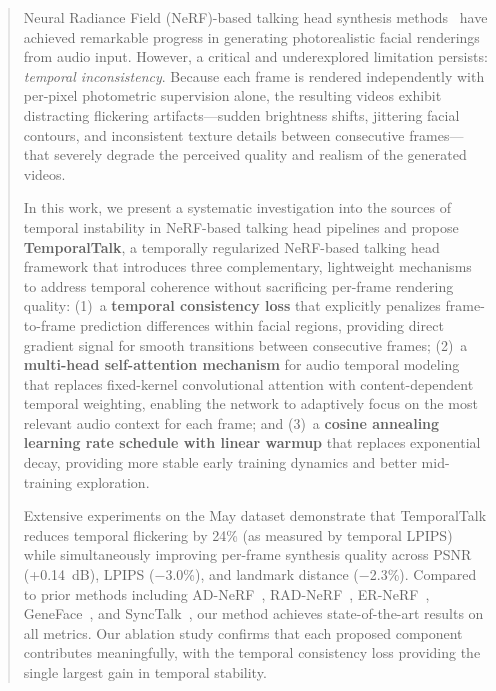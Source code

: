 \documentclass[10pt,twocolumn,letterpaper]{article}
\begin{document}
\begin{abstract}
Neural Radiance Field (NeRF)-based talking head synthesis methods~\cite{guo2021adnerf,tang2022radnerf,li2023ernerf,peng2024synctalk} have achieved remarkable progress in generating photorealistic facial renderings from audio input.
However, a critical and underexplored limitation persists: \emph{temporal inconsistency}.
Because each frame is rendered independently with per-pixel photometric supervision alone, the resulting videos exhibit distracting flickering artifacts---sudden brightness shifts, jittering facial contours, and inconsistent texture details between consecutive frames---that severely degrade the perceived quality and realism of the generated videos.

In this work, we present a systematic investigation into the sources of temporal instability in NeRF-based talking head pipelines and propose \textbf{TemporalTalk}, a temporally regularized NeRF-based talking head framework that introduces three complementary, lightweight mechanisms to address temporal coherence without sacrificing per-frame rendering quality:
(1)~a \textbf{temporal consistency loss} that explicitly penalizes frame-to-frame prediction differences within facial regions, providing direct gradient signal for smooth transitions between consecutive frames;
(2)~a \textbf{multi-head self-attention mechanism} for audio temporal modeling that replaces fixed-kernel convolutional attention with content-dependent temporal weighting, enabling the network to adaptively focus on the most relevant audio context for each frame;
and (3)~a \textbf{cosine annealing learning rate schedule with linear warmup} that replaces exponential decay, providing more stable early training dynamics and better mid-training exploration.

Extensive experiments on the May dataset demonstrate that TemporalTalk reduces temporal flickering by 24\% (as measured by temporal LPIPS) while simultaneously improving per-frame synthesis quality across PSNR (+0.14~dB), LPIPS ($-$3.0\%), and landmark distance ($-$2.3\%).
Compared to prior methods including AD-NeRF~\cite{guo2021adnerf}, RAD-NeRF~\cite{tang2022radnerf}, ER-NeRF~\cite{li2023ernerf}, GeneFace~\cite{ye2023geneface}, and SyncTalk~\cite{peng2024synctalk}, our method achieves state-of-the-art results on all metrics.
Our ablation study confirms that each proposed component contributes meaningfully, with the temporal consistency loss providing the single largest gain in temporal stability.
\end{abstract}
\end{document}
